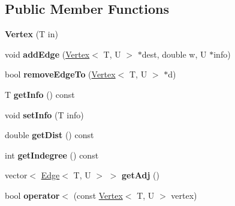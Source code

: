 \subsection*{Public Member Functions}
\begin{DoxyCompactItemize}
\item 
{\bfseries Vertex} (T in)\hypertarget{class_vertex_a7376d289d627ca743c31ff81b8e6e2cc}{}\label{class_vertex_a7376d289d627ca743c31ff81b8e6e2cc}

\item 
void {\bfseries add\+Edge} (\hyperlink{class_vertex}{Vertex}$<$ T, U $>$ $\ast$dest, double w, U $\ast$info)\hypertarget{class_vertex_a1671c74e85d9f4fce8a51aafb8094656}{}\label{class_vertex_a1671c74e85d9f4fce8a51aafb8094656}

\item 
bool {\bfseries remove\+Edge\+To} (\hyperlink{class_vertex}{Vertex}$<$ T, U $>$ $\ast$d)\hypertarget{class_vertex_ad785fe108a5867370baf09ce04f15de7}{}\label{class_vertex_ad785fe108a5867370baf09ce04f15de7}

\item 
T {\bfseries get\+Info} () const \hypertarget{class_vertex_a94729f236fbeebf0febfc2b08a3806fa}{}\label{class_vertex_a94729f236fbeebf0febfc2b08a3806fa}

\item 
void {\bfseries set\+Info} (T info)\hypertarget{class_vertex_a63939669caca4a3990c1cda699c361d5}{}\label{class_vertex_a63939669caca4a3990c1cda699c361d5}

\item 
double {\bfseries get\+Dist} () const \hypertarget{class_vertex_a8a305cc552459bbfb4d2b394081a83a9}{}\label{class_vertex_a8a305cc552459bbfb4d2b394081a83a9}

\item 
int {\bfseries get\+Indegree} () const \hypertarget{class_vertex_a4665dac0df974a3eded2d7573e2ce042}{}\label{class_vertex_a4665dac0df974a3eded2d7573e2ce042}

\item 
vector$<$ \hyperlink{class_edge}{Edge}$<$ T, U $>$ $>$ {\bfseries get\+Adj} ()\hypertarget{class_vertex_a028d730c627918d3d452e5dc9b40b2fc}{}\label{class_vertex_a028d730c627918d3d452e5dc9b40b2fc}

\item 
bool {\bfseries operator$<$} (const \hyperlink{class_vertex}{Vertex}$<$ T, U $>$ vertex)\hypertarget{class_vertex_a46be891a4fe4a2c748211da700664dba}{}\label{class_vertex_a46be891a4fe4a2c748211da700664dba}

\end{DoxyCompactItemize}
